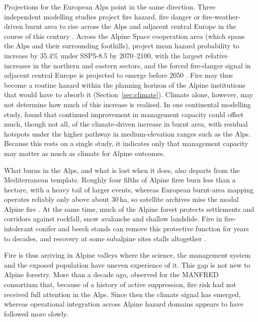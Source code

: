 \documentclass[11pt,a4paper]{article}
\begin{document}
Projections for the European Alps point in the same direction. Three independent modelling studies project fire hazard, fire danger or fire-weather-driven burnt area to rise across the Alps and adjacent central Europe in the course of this century \citep{gerberding_mapping_2025, miller_climate_2024, billing_future_2026}. Across the Alpine Space cooperation area (which spans the Alps and their surrounding foothills), \citet{gerberding_mapping_2025} project mean hazard probability to increase by 35.4\% under SSP5-8.5 by 2070--2100, with the largest relative increases in the northern and eastern sectors, and the forced fire-danger signal in adjacent central Europe is projected to emerge before 2050 \citep{miller_climate_2024}. Fire may thus become a routine hazard within the planning horizon of the Alpine institutions that would have to absorb it (Section~\ref{sec:climate}). Climate alone, however, may not determine how much of this increase is realised. In one continental modelling study, \citet{billing_future_2026} found that continued improvement in management capacity could offset much, though not all, of the climate-driven increase in burnt area, with residual hotspots under the higher pathway in medium-elevation ranges such as the Alps. Because this rests on a single study, it indicates only that management capacity may matter as much as climate for Alpine outcomes.

What burns in the Alps, and what is lost when it does, also departs from the Mediterranean template. Roughly four fifths of Alpine fires burn less than a hectare, with a heavy tail of larger events, whereas European burnt-area mapping operates reliably only above about 30\,ha, so satellite archives miss the modal Alpine fire \citep{muller_forest_2020, conedera_characterizing_2018, beloiu_climatedriven_2026}. At the same time, much of the Alpine forest protects settlements and corridors against rockfall, snow avalanche and shallow landslide. Fire in fire-intolerant conifer and beech stands can remove this protective function for years to decades, and recovery at some subalpine sites stalls altogether \citep{melzner_wildfire-induced_2025, melzner_brief_2019, maringer_temporal_2016, gehring_shallow_2019, degiuli_arrested_2024}.

Fire is thus arriving in Alpine valleys where the science, the management system and the exposed population have uneven experience of it. This gap is not new to Alpine forestry. More than a decade ago, \citet{jandl_management_2013} observed for the MANFRED consortium that, because of a history of active suppression, fire risk had not received full attention in the Alps. Since then the climate signal has emerged, whereas operational integration across Alpine hazard domains appears to have followed more slowly.
\end{document}
